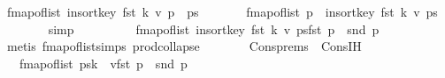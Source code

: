 \begin{isabellebody}
\ {\isachardoublequoteopen}fmap{\isacharunderscore}{\kern0pt}of{\isacharunderscore}{\kern0pt}list\ {\isacharparenleft}{\kern0pt}insort{\isacharunderscore}{\kern0pt}key\ fst\ {\isacharparenleft}{\kern0pt}k{\isacharcomma}{\kern0pt}\ v{\isacharparenright}{\kern0pt}\ {\isacharparenleft}{\kern0pt}p\ {\isacharhash}{\kern0pt}\ ps{\isacharparenright}{\kern0pt}{\isacharparenright}{\kern0pt}\ {\isacharequal}{\kern0pt}\isanewline
\ \ \ \ \ \ fmap{\isacharunderscore}{\kern0pt}of{\isacharunderscore}{\kern0pt}list\ {\isacharparenleft}{\kern0pt}p\ {\isacharhash}{\kern0pt}\ insort{\isacharunderscore}{\kern0pt}key\ fst\ {\isacharparenleft}{\kern0pt}k{\isacharcomma}{\kern0pt}\ v{\isacharparenright}{\kern0pt}\ ps{\isacharparenright}{\kern0pt}{\isachardoublequoteclose}\isanewline
\ \ \ \ \ \ \isamarkupfalse%
\ simp\isanewline
\ \ \ \ \isamarkupfalse%
\ \isamarkupfalse%
\ {\isachardoublequoteopen}{\isasymdots}\ {\isacharequal}{\kern0pt}\ {\isacharparenleft}{\kern0pt}fmap{\isacharunderscore}{\kern0pt}of{\isacharunderscore}{\kern0pt}list\ {\isacharparenleft}{\kern0pt}insort{\isacharunderscore}{\kern0pt}key\ fst\ {\isacharparenleft}{\kern0pt}k{\isacharcomma}{\kern0pt}\ v{\isacharparenright}{\kern0pt}\ ps{\isacharparenright}{\kern0pt}{\isacharparenright}{\kern0pt}{\isacharparenleft}{\kern0pt}fst\ p\ {\isachardollar}{\kern0pt}{\isachardollar}{\kern0pt}{\isacharcolon}{\kern0pt}{\isacharequal}{\kern0pt}\ snd\ p{\isacharparenright}{\kern0pt}{\isachardoublequoteclose}\isanewline
\ \ \ \ \ \ \isamarkupfalse%
\ {\isacharparenleft}{\kern0pt}metis\ fmap{\isacharunderscore}{\kern0pt}of{\isacharunderscore}{\kern0pt}list{\isacharunderscore}{\kern0pt}simps{\isacharparenleft}{\kern0pt}{}{\isacharparenright}{\kern0pt}\ prod{\isachardot}{\kern0pt}collapse{\isacharparenright}{\kern0pt}\isanewline
\ \ \ \ \isamarkupfalse%
\ \isamarkupfalse%
\ Cons{\isachardot}{\kern0pt}prems{\isacharparenleft}{\kern0pt}{}{\isacharcomma}{\kern0pt}{}{\isacharparenright}{\kern0pt}\ \ Cons{\isachardot}{\kern0pt}IH\ \isamarkupfalse%
\ {\isachardoublequoteopen}{\isasymdots}\ {\isacharequal}{\kern0pt}\ {\isacharparenleft}{\kern0pt}fmap{\isacharunderscore}{\kern0pt}of{\isacharunderscore}{\kern0pt}list\ ps{\isacharparenright}{\kern0pt}{\isacharparenleft}{\kern0pt}k\ {\isachardollar}{\kern0pt}{\isachardollar}{\kern0pt}{\isacharcolon}{\kern0pt}{\isacharequal}{\kern0pt}\ v{\isacharparenright}{\kern0pt}{\isacharparenleft}{\kern0pt}fst\ p\ {\isachardollar}{\kern0pt}{\isachardollar}{\kern0pt}{\isacharcolon}{\kern0pt}{\isacharequal}{\kern0pt}\ snd\ p{\isacharparenright}{\kern0pt}{\isachardoublequoteclose}\isanewline

\end{isabellebody}
